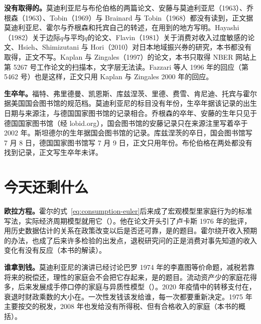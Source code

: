 \begin{deeper}[史料说明]
\textbf{没有取得的。}莫迪利亚尼与布伦伯格的两篇论文、安藤与莫迪利亚尼（1963）、乔根森（1963）、Tobin（1969）与 Brainard 与 Tobin（1968）都没有读到，正文据莫迪利亚尼、霍尔与乔根森和托宾自己的转述，在用到的地方写明。Hayashi（1982）关于边际$q$与平均$q$的论文、Flavin（1981）关于消费对收入过度敏感的论文、Hsieh、Shimizutani 与 Hori（2010）对日本地域振兴券的研究，本书都没有取得，正文不写。Kaplan 与 Zingales（1997）的论文，本书只取得 NBER 网站上第 5267 号工作论文的扫描本，文字层无法读。Fazzari 等人 1996 年的回应（第 5462 号）也是这样，正文只用 Kaplan 与 Zingales 2000 年的回应。

\textbf{生卒年。}福特、弗里德曼、凯恩斯、库兹涅茨、里德、费雪、肯尼迪、托宾与霍尔据美国国会图书馆的规范档。莫迪利亚尼的标目没有年份，生卒年据该记录的出生日期与来源注，与德国国家图书馆的记录相合。乔根森的卒年、安藤的生年只见于德国国家图书馆（经 lobid.org），国会图书馆的安藤记录只在来源注里写着卒于 2002 年。斯坦德尔的生年据国会图书馆的记录。库兹涅茨的卒日，国会图书馆写 7 月 8 日，德国国家图书馆写 7 月 9 日，正文只用年份。布伦伯格在两处都没有找到记录，正文写生卒年未详\cite{loc39,gnd39}。
\end{deeper}

\section{今天还剩什么}\label{sec:consumption-legacy}

\textbf{欧拉方程。}霍尔的式~\eqref{eq:consumption-euler}后来成了宏观模型里家庭行为的标准写法，实际经济周期模型就用它（）。他在论文开头引了卢卡斯 1976 年的批评，用历史数据估计的关系在政策改变以后是否还可靠，是的题目。霍尔绕开收入预期的办法，也成了后来许多检验的出发点，退税研究问的正是消费对事先知道的收入变化有没有反应（本书的解读）。

\textbf{谁拿到钱。}莫迪利亚尼的演讲已经讨论巴罗 1974 年的李嘉图等价命题，减税若靠将来的税偿还，理性的家庭会不会把它存起来，是的题目\cite{modigliani1985}。流动资产少的家庭花得多，后来发展成手停口停的家庭与异质性模型（）。2020 年疫情中的转移支付在，衰退时财政乘数的大小在。一次性发钱该发给谁，每一次都要重新决定。1975 年主要按交的税发，2008 年也发给没有所得税、但有合格收入的家庭（本书的概括）。

